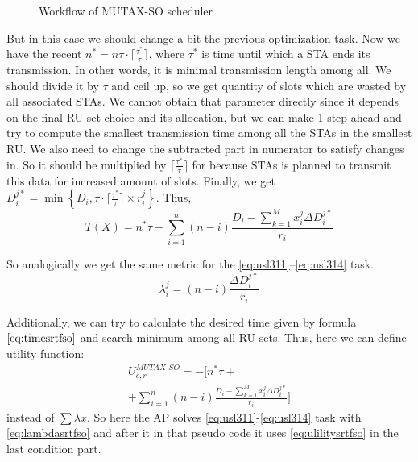\begin{figure}[tb]
\begin{scaletikzpicturetowidth}{\columnwidth}
	\end{scaletikzpicturetowidth}
	\caption{\label{fig:mutexso} Workflow of MUTAX-SO scheduler}		
\end{figure}

But in this case we should change a bit the previous optimization task. Now we have the recent $n^* = n\tau\cdot\lceil\frac{\tau^*}{\tau}\rceil$, where $\tau^*$ is time until which a STA ends its transmission. In other words, it is minimal transmission length among all. We should divide it by $\tau$ and ceil up, so we get quantity of slots which are wasted by all associated STAs. We cannot obtain that parameter directly since it depends on the final RU set choice and its allocation, but we can make 1 step ahead and try to compute the smallest transmission time among all the STAs in the smallest RU. We also need to change the subtracted part in numerator to satisfy changes in. So it should be multiplied by $\lceil\frac{\tau^*}{\tau}\rceil$ for because STAs is planned to transmit this data for increased amount of slots. Finally, we get $D_i^{j*} = \min\left\{D_i, \tau\cdot\lceil\frac{\tau^*}{\tau}\rceil \times r_{i}^{j}\right\}$. Thus,  
\begin{equation}
\label{eq:timesrtfso}
T\left(X\right) = n^* \tau + \sum_{i = 1}^{n} \left(n - i\right) \frac{D_i -  \sum_{k = 1}^{M} x_i^j \Delta D_i^{j*}}{r_{i}}
\end{equation}

So analogically we get the same metric for the \eqref{eq:usl311}--\eqref{eq:usl314} task.
\begin{equation}
\label{eq:lambdasrtfso}
\lambda_i^j = \left(n - i\right) \frac{\Delta D_i^{j*}}{r_{i}}
\end{equation}

Additionally, we can try to calculate the desired time given by formula $\eqref{eq:timesrtfso}$ and search minimum among all RU sets. Thus, here we can define utility function:
\begin{multline}
\label{eq:ulilitysrtfso}
U_{c,r}^{MUTAX\text{-}SO} = -\Biggl[ n^* \tau +\\
+ \sum_{i = 1}^{n} \left(n - i\right) \frac{D_i -  \sum_{k = 1}^{M} x_i^j \Delta D_i^{j*}}{r_{i}}\Biggr]
\end{multline}
instead of $\sum \lambda x$. So here the AP solves \eqref{eq:usl311}-\eqref{eq:usl314} task with \eqref{eq:lambdasrtfso} and after it in that pseudo code it uses \eqref{eq:ulilitysrtfso} in the last condition part.
